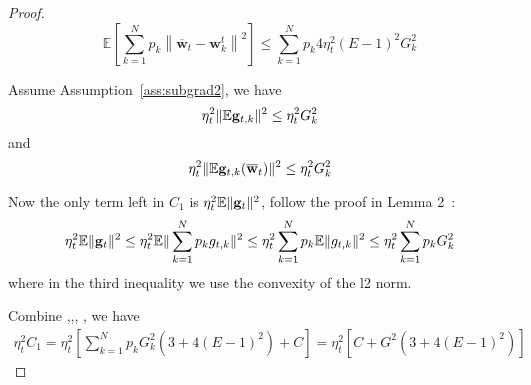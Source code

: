 \begin{proof}
\begin{equation}
\mathbb{E}\left[\sum_{k=1}^{N} p_{k}\left\|\overline{\mathbf{w}}_{t}-\mathbf{w}_{k}^{t}\right\|^{2}\right] \leq \sum_{k=1}^N p_k4 \eta_{t}^{2}(E-1)^{2} G_k^{2}
	\label{eq:g4}
\end{equation}


Assume Assumption~\ref{ass:subgrad2}, we have 
\begin{equation}
	\eta_t^2 \|\mathbb{E} {\mathbf{g}}_{t,k}\|^2 \leq  \eta_t^2 G_k^2
	\label{eq:g3}
\end{equation}
and
\begin{equation}
	\eta_t^2 \|\mathbb{E} {\mathbf{g}}_{t,k}(\overline{{\mathbf{w}}}_t)\|^2 \leq  \eta_t^2 G_k^2
	\label{eq:g2}
\end{equation}


Now the only term left in $C_1$ is $\eta_{t}^{2} \mathbb{E}\| {\mathbf{g}}_{t} \|^{2} $, follow the proof in Lemma 2~\cite{li2019convergence}: 
\begin{align}
	  \eta_{t}^{2} \mathbb{E}\| {\mathbf{g}}_{t} \|^{2} 
	\leq   \eta_{t}^{2} \mathbb{E}\| \sum_{k=1}^N p_k g_{t,k} \|^{2} 
	\leq   \eta_{t}^{2} \sum_{k=1}^N p_k \mathbb{E}\| g_{t,k} \|^{2} 
	\leq   \eta_{t}^{2} \sum_{k=1}^N p_k G_k^2  \label{eq:g1}
\end{align}
where in the third inequality we use the convexity of the l2 norm.

Combine \eq{\ref{eq:g4}},\eq{\ref{eq:g3}},\eq{\ref{eq:g2}}, \eq{\ref{eq:g1}},
we have 
\begin{align}
\eta_t^2 C_1  = \eta_t^2 [\sum_{k=1}^N p_k G_k^2 \left(3 + 4(E-1)^2\right) + C]  = \eta_t^2 [C+ G^2 \left(3 + 4(E-1)^2\right)]
\end{align}

\end{proof}
